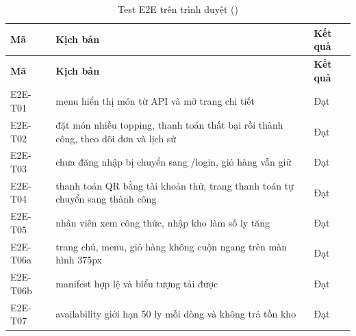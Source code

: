 {\small
\begin{longtable}{@{}L{1.9cm}L{10.6cm}L{1.3cm}@{}}
\caption{Test E2E trên trình duyệt ()}\label{tab:e2e}\\
\toprule
\textbf{Mã} & \textbf{Kịch bản} & \textbf{Kết quả} \\ \midrule \endfirsthead
\toprule \textbf{Mã} & \textbf{Kịch bản} & \textbf{Kết quả} \\ \midrule \endhead
\bottomrule \endfoot
E2E-T01 & menu hiển thị món từ API và mở trang chi tiết & Đạt \\
E2E-T02 & đặt món nhiều topping, thanh toán thất bại rồi thành công, theo dõi đơn và lịch sử & Đạt \\
E2E-T03 & chưa đăng nhập bị chuyển sang /login, giỏ hàng vẫn giữ & Đạt \\
E2E-T04 & thanh toán QR bằng tài khoản thử, trang thanh toán tự chuyển sang thành công & Đạt \\
E2E-T05 & nhân viên xem công thức, nhập kho làm số ly tăng & Đạt \\
E2E-T06a & trang chủ, menu, giỏ hàng không cuộn ngang trên màn hình 375px & Đạt \\
E2E-T06b & manifest hợp lệ và biểu tượng tải được & Đạt \\
E2E-T07 & availability giới hạn 50 ly mỗi dòng và không trả tồn kho & Đạt \\
\end{longtable}
}